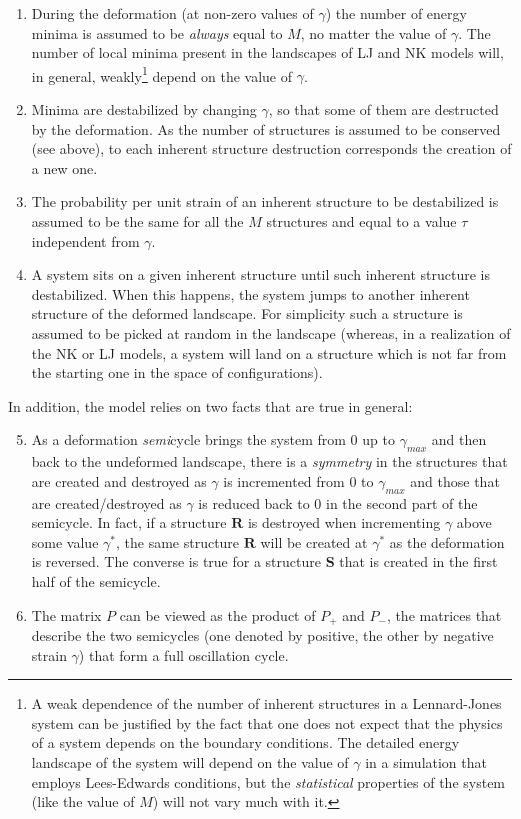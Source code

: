 \begin{enumerate}
		\item During the deformation (at non-zero values of $\gamma$) the number of energy minima is assumed to be \emph{always} equal to $M$, no matter the value of $\gamma$. The number of local minima present in the landscapes of LJ and NK models will, in general, weakly\footnote{A weak dependence of the number of inherent structures in a Lennard-Jones system can be justified by the fact that one does not expect that the physics of a system depends on the boundary conditions. The detailed energy landscape of the system will depend on the value of $\gamma$ in a simulation that employs Lees-Edwards conditions, but the \emph{statistical} properties of the system (like the value of $M$) will not vary much with it.} depend on the value of $\gamma$.  
		\item Minima are destabilized by changing $\gamma$, so that some of them are destructed by the deformation. As the number of structures is assumed to be conserved (see above), to each inherent structure destruction corresponds the creation of a new one.
		\item The probability per unit strain of an inherent structure to be destabilized is assumed to be the same for all the $M$ structures and equal to a value $\tau$ independent from $\gamma$.
		\item A system sits on a given inherent structure until such inherent structure is destabilized. When this happens, the system jumps to another inherent structure of the deformed landscape. For simplicity such a structure is assumed to be picked at random in the landscape (whereas, in a realization of the NK or LJ models, a system will land on a structure which is not far from the starting one in the space of configurations).
\end{enumerate}

In addition, the model relies on two facts that are true in general:

\begin{enumerate}
		\setcounter{enumi}{4}
		\item As a deformation \emph{semi}cycle brings the system from 0 up to $\gamma_{max}$ and then back to the undeformed landscape, there is a \emph{symmetry} in the structures that are created and destroyed as $\gamma$ is incremented from $0$ to $\gamma_{max}$ and those that are created/destroyed as $\gamma$ is reduced back to 0 in the second part of the semicycle. In fact, if a structure $\mathbf{R}$ is destroyed when incrementing $\gamma$ above some value $\gamma^{*}$, the same structure $\mathbf{R}$ will be created at $\gamma^{*}$ as the deformation is reversed. The converse is true for a structure $\mathbf{S}$ that is created in the first half of the semicycle.
		\item The matrix $P$ can be viewed as the product of $P_{+}$ and $P_{-}$, the matrices that describe the two semicycles (one denoted by positive, the other by negative strain $\gamma$) that form a full oscillation cycle.		
\end{enumerate}

